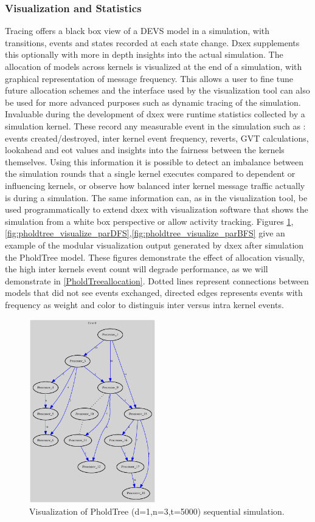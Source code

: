 \subsubsection{Visualization and Statistics}
Tracing offers a black box view of a DEVS model in a simulation, with transitions, events and states recorded at each state change. Dxex supplements this optionally with more in depth insights into the actual simulation. The allocation of models across kernels is visualized at the end of a simulation, with graphical representation of message frequency. This allows a user to fine tune future allocation schemes and the interface used by the visualization tool can also be used for more advanced purposes such as dynamic tracing of the simulation.\\
Invaluable during the development of dxex were runtime statistics collected by a simulation kernel. These record any measurable event in the simulation such as : events created/destroyed, inter kernel event frequency, reverts, GVT calculations, lookahead and eot values and insights into the fairness between the kernels themselves. Using this information it is possible to detect an imbalance between the simulation rounds that a single kernel executes compared to dependent or influencing kernels, or observe how balanced inter kernel message traffic actually is during a simulation. The same information can, as in the visualization tool, be used programmatically to extend dxex with visualization software that shows the simulation from a white box perspective or allow activity tracking.
Figures \ref{fig:pholdtree_visualize_seq},\ref{fig:pholdtree_visualize_parDFS},\ref{fig:pholdtree_visualize_parBFS} give an example of the modular visualization output generated by dxex after simulation the PholdTree model. These figures demonstrate the effect of allocation visually, the high inter kernels event count will degrade performance, as we will demonstrate in 
\ref{PholdTreeallocation}. Dotted lines represent connections between models that did not see events exchanged, directed edges represents events with frequency as weight and color to distinguis inter versus intra kernel events.
\begin{figure}
	\center
	\includegraphics[width=\plotfraction\columnwidth, height=8cm, keepaspectratio]{fig/pholdtreed1n3t5000.eps}
	\caption{Visualization of PholdTree (d=1,n=3,t=5000) sequential simulation.}
	\label{fig:pholdtree_visualize_seq}
\end{figure}
